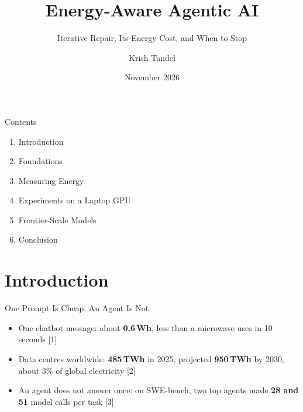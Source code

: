 \documentclass[aspectratio=169,11pt,t]{beamer}
\title{Energy-Aware Agentic AI}
\subtitle{Iterative Repair, Its Energy Cost, and When to Stop}
\author{Krish Tandel}
\institute{Indian Institute of Technology Bombay}
\date{November 2026}
\newcommand{\hl}[1]{{\color{accent}\bfseries #1}}
\newcommand{\src}[1]{{\tiny\color{footgrey}#1}}
\begin{document}
{\begin{frame}[noframenumbering]\titlepage\end{frame}}

\begin{frame}{Contents}
\rmfamily\bfseries\color{navy}
\begin{enumerate}\setlength{\itemsep}{0.9em}
\item Introduction
\item Foundations
\item Measuring Energy
\item Experiments on a Laptop GPU
\item Frontier-Scale Models
\item Conclusion
\end{enumerate}
\end{frame}

\section{Introduction}

\begin{frame}{One Prompt Is Cheap. An Agent Is Not.}
\begin{itemize}
\item<1-> One chatbot message: about \hl{0.6\,Wh}, less than a microwave uses in 10 seconds \src{[1]}
\item<2-> Data centres worldwide: \hl{485\,TWh} in 2025, projected \hl{950\,TWh} by 2030, about 3\% of global electricity \src{[2]}
\item<3-> An agent does not answer once: on SWE-bench, two top agents made \hl{28 and 51} model calls per task \src{[3]}
\end{itemize}
\vspace{0.6em}
\end{frame}
\end{document}
